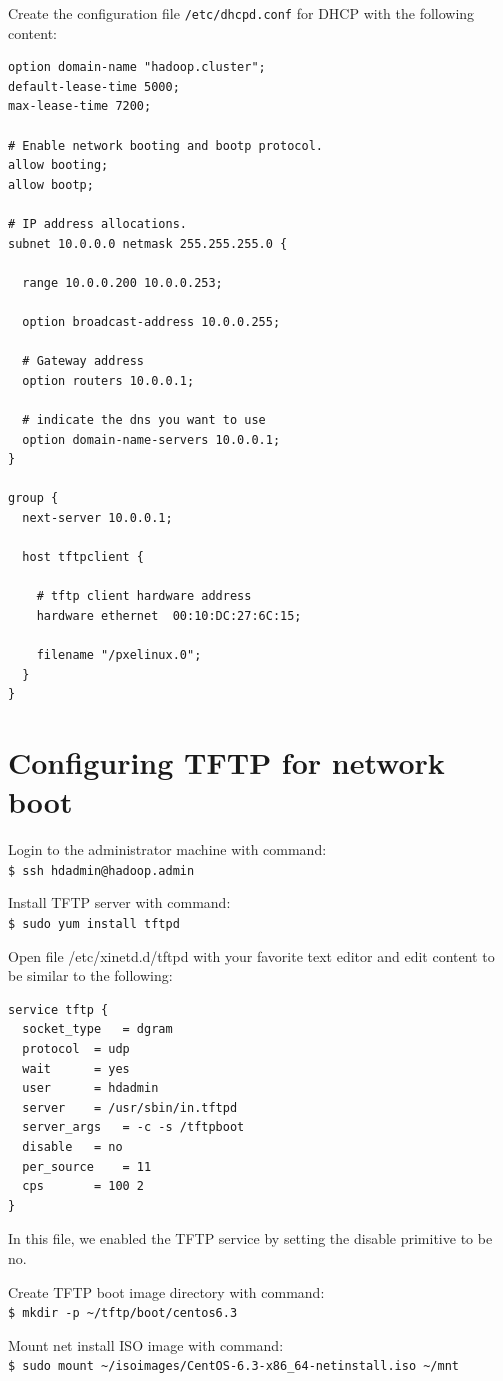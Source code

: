 Create the configuration file \verb|/etc/dhcpd.conf| for DHCP with the following content:
\lstset{style=bashstyle}
\begin{lstlisting}
option domain-name "hadoop.cluster";
default-lease-time 5000;
max-lease-time 7200;

# Enable network booting and bootp protocol.
allow booting;
allow bootp;

# IP address allocations.
subnet 10.0.0.0 netmask 255.255.255.0 {

  range 10.0.0.200 10.0.0.253;

  option broadcast-address 10.0.0.255;

  # Gateway address
  option routers 10.0.0.1;

  # indicate the dns you want to use
  option domain-name-servers 10.0.0.1;
}

group {
  next-server 10.0.0.1;

  host tftpclient {

    # tftp client hardware address
    hardware ethernet  00:10:DC:27:6C:15;

    filename "/pxelinux.0";
  }
}
\end{lstlisting}

\section{Configuring TFTP for network boot}
Login to the administrator machine with command: \\
\verb|$ ssh hdadmin@hadoop.admin|

Install TFTP server with command: \\
\verb|$ sudo yum install tftpd|

Open file /etc/xinetd.d/tftpd with your favorite text editor and edit content to be similar to the following:
\lstset{style=bashstyle}
\begin{lstlisting}
service tftp {
  socket_type	= dgram
  protocol	= udp
  wait		= yes
  user		= hdadmin
  server	= /usr/sbin/in.tftpd
  server_args	= -c -s /tftpboot
  disable  	= no
  per_source	= 11
  cps		= 100 2
}
\end{lstlisting}
In this file, we enabled the TFTP service by setting the disable primitive to be no.

Create TFTP boot image directory with command: \\
\verb|$ mkdir -p ~/tftp/boot/centos6.3|

Mount net install ISO image with command: \\
\verb|$ sudo mount ~/isoimages/CentOS-6.3-x86_64-netinstall.iso ~/mnt|


